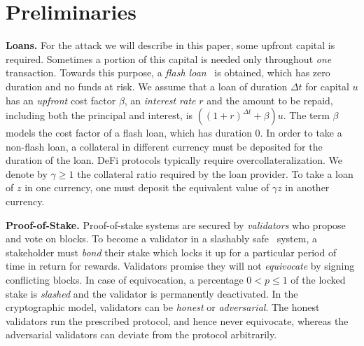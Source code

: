 \section{Preliminaries}\label{sec:preliminaries}


\noindent
\textbf{Loans.} For the attack we will describe in this paper, some upfront
capital is required. Sometimes a portion of this capital is needed only throughout \emph{one}
transaction. Towards this purpose, a \emph{flash loan}~\cite{gudgeon2020defi} is obtained,
which has zero duration and no funds at risk. We assume that
a loan of duration $\Delta t$ for capital $u$ has an \emph{upfront} cost factor $\beta$,
an \emph{interest rate} $r$ and the amount to be repaid, including both the principal and interest, is
$((1 + r)^{\Delta t} + \beta) u$. The term $\beta$ models the cost factor of a flash loan,
which has duration $0$.
In order to take a non-flash loan, a collateral in different currency must be deposited for the duration
of the loan. DeFi protocols typically require overcollateralization. We denote by
$\gamma \geq 1$ the collateral ratio required by the loan provider.
To take a loan of $z$ in one currency, one must deposit the equivalent
value of $\gamma z$ in another currency.

\noindent
\textbf{Proof-of-Stake.} Proof-of-stake systems are secured
by \emph{validators} who propose and vote
on blocks. To become a validator in a slashably safe~\cite{slashable-safety}
system, a stakeholder must \emph{bond} their stake
which locks it up for a particular period of time in return for rewards.
Validators promise they will
not \emph{equivocate} by signing conflicting blocks.
In case of equivocation, a percentage $0 < p \leq 1$ of the locked stake is
\emph{slashed} and the validator is permanently deactivated. In the cryptographic
model, validators can be \emph{honest} or \emph{adversarial}. The honest validators
run the prescribed protocol, and hence never equivocate, whereas the adversarial
validators can deviate from the protocol arbitrarily.

